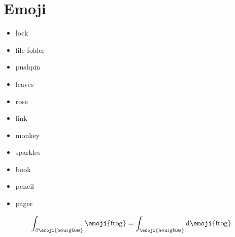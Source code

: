 \documentclass[12pt]{article}
\begin{document}
\section{Emoji }%
\label{sec:Emoji}

\begin{itemize}
	\item lock 
	\item file-folder  
	\item pushpin  
	\item leaves 
	\item rose 
	\item link 
	\item monkey 
	\item sparkles 
	\item book 
	\item pencil 
	\item pager 
\end{itemize}

$$
	\int_{\partial\text{\emoji{hourglass}}} \text{\emoji{frog}}
	= \int_\text{\emoji{hourglass}} \mathrm{d}\text{\emoji{frog}}
$$
\end{document}
